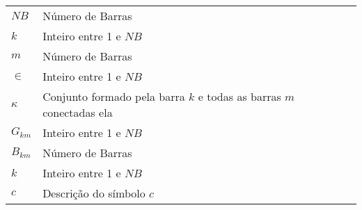 

\begin{table}[!ht]
  \begin{tabular}{p{3cm}l}
	$NB$        & N\'umero de Barras \\
	$k$       & Inteiro entre 1 e $NB$\\
	$m$        & N\'umero de Barras \\
	$\in$       & Inteiro entre 1 e $NB$\\
	$\kappa$        & Conjunto formado pela barra $k$ e todas as barras $m$ conectadas ela \\
	$G_{km}$       & Inteiro entre 1 e $NB$\\
	$B_{km}$        & N\'umero de Barras \\
	$k$       & Inteiro entre 1 e $NB$\\
	
	$c$       & Descrição do símbolo $c$ 
  \end{tabular}
\end{table}